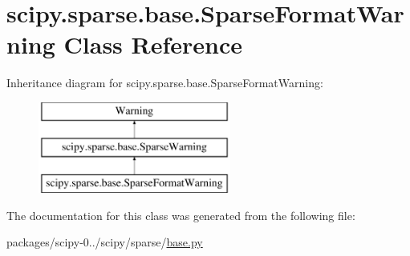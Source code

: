 \hypertarget{classscipy_1_1sparse_1_1base_1_1SparseFormatWarning}{}\section{scipy.\+sparse.\+base.\+Sparse\+Format\+Warning Class Reference}
\label{classscipy_1_1sparse_1_1base_1_1SparseFormatWarning}
Inheritance diagram for scipy.\+sparse.\+base.\+Sparse\+Format\+Warning\+:\begin{figure}[H]
\begin{center}
\leavevmode
\includegraphics[height=3.000000cm]{classscipy_1_1sparse_1_1base_1_1SparseFormatWarning}
\end{center}
\end{figure}


The documentation for this class was generated from the following file\+:\begin{DoxyCompactItemize}
\item 
packages/scipy-\/0../scipy/sparse/\hyperlink{base_8py}{base.\+py}\end{DoxyCompactItemize}
